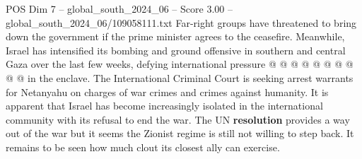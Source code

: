 \begin{textsample}{POS Dim 7 – global\_south\_2024\_06 – Score 3.00 – global\_south\_2024\_06/109058111.txt}
Far-right groups have threatened to bring down the government if the prime minister agrees to the ceasefire.
Meanwhile, Israel has intensified its bombing and ground offensive in southern and central Gaza over the last few weeks, defying international pressure @ @ @ @ @ @ @ @ @ @ in the enclave.
The International Criminal Court is seeking arrest warrants for Netanyahu on charges of war crimes and crimes against humanity.
It is apparent that Israel has become increasingly isolated in the international community with its refusal to end the war.
The UN \textbf{resolution} provides a way out of the war but it seems the Zionist regime is still not willing to step back.
It remains to be seen how much clout its closest ally can exercise.

\end{textsample}
